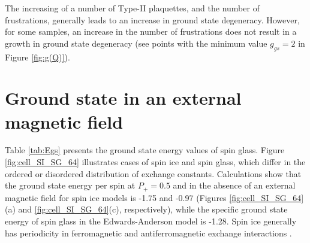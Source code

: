\documentclass[preprint,12pt]{elsarticle}
\begin{document}
	The increasing of a number of Type-II plaquettes, and the number of frustrations, generally leads to an increase in ground state degeneracy. However, for some samples, an increase in the number of frustrations does not result in a growth in ground state degeneracy (see points with the minimum value $g_{gs}=2$ in Figure \ref{fig:g(Q)}). 
	
	\section{Ground state in an external magnetic field}
	
	Table \ref{tab:Egs} presents the ground state energy values of spin glass. Figure \ref{fig:cell_SI_SG_64} illustrates cases of spin ice and spin glass, which differ in the ordered or disordered distribution of exchange constants. Calculations show that the ground state energy per spin at $P_+ = 0.5$ and in the absence of an external magnetic field for spin ice models is -1.75 and -0.97 (Figures \ref{fig:cell_SI_SG_64}(a) and \ref{fig:cell_SI_SG_64}(c), respectively), while the specific ground state energy of spin glass in the Edwards-Anderson model is -1.28. Spin ice generally has periodicity in ferromagnetic and antiferromagnetic exchange interactions \cite{peretyatko2017interplay, otsuka2018husimi, andriushchenko2019large, shevchenko2017effect, kato2022flux}. 
	
\end{document}
